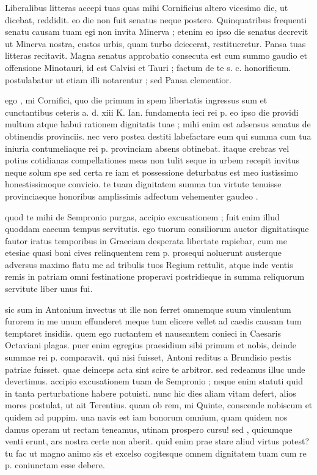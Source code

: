 


 Liberalibus litteras accepi tuas quas mihi Cornificius altero vicesimo die, ut dicebat, reddidit. eo die non fuit senatus neque postero. Quinquatribus frequenti senatu causam tuam egi non invita Minerva ; etenim eo ipso die senatus decrevit ut Minerva nostra, custos urbis, quam turbo deiecerat, restitueretur. Pansa tuas litteras recitavit. Magna senatus approbatio consecuta est cum summo gaudio et offensione Minotauri, id est Calvisi et Tauri ; factum de te s. c. honorificum. postulabatur ut etiam illi notarentur ; sed Pansa clementior.

 ego , mi Cornifici, quo die primum in spem libertatis ingressus sum et cunctantibus ceteris a. d. xiii K. Ian. fundamenta ieci rei p. eo ipso die providi multum atque habui rationem dignitatis tuae ; mihi enim est adsensus senatus de obtinendis provinciis. nec vero postea destiti labefactare eum qui summa cum tua iniuria contumeliaque rei p. provinciam absens obtinebat. itaque crebras vel potius cotidianas compellationes meas non tulit seque in urbem recepit invitus neque solum spe sed certa re iam et possessione deturbatus est meo iustissimo honestissimoque convicio. te tuam dignitatem summa tua virtute tenuisse provinciaeque honoribus amplissimis adfectum vehementer gaudeo .

 quod te mihi de Sempronio purgas, accipio excusationem ; fuit enim illud quoddam caecum tempus servitutis. ego tuorum consiliorum auctor dignitatisque fautor iratus temporibus in Graeciam desperata libertate rapiebar, cum me etesiae quasi boni cives relinquentem rem p. prosequi noluerunt austerque adversus maximo flatu me ad tribulis tuos Regium rettulit, atque inde ventis remis in patriam omni festinatione properavi postridieque in summa reliquorum servitute liber unus fui.

 sic sum in Antonium invectus ut ille non ferret omnemque suum vinulentum furorem in me unum effunderet meque tum elicere vellet ad caedis causam tum temptaret insidiis. quem ego ructantem et nauseantem conieci in Caesaris Octaviani plagas. puer enim egregius praesidium sibi primum et nobis, deinde summae rei p. comparavit. qui nisi fuisset, Antoni reditus a Brundisio pestis patriae fuisset. quae deinceps acta sint scire te arbitror. sed redeamus illuc unde devertimus. accipio excusationem tuam de Sempronio ; neque enim statuti quid in tanta perturbatione habere potuisti. nunc hic dies aliam vitam defert, alios mores postulat, ut ait Terentius. quam ob rem, mi Quinte, conscende nobiscum et quidem ad puppim. una navis est iam bonorum omnium, quam quidem nos damus operam ut rectam teneamus, utinam prospero cursu! sed , quicumque venti erunt, ars nostra certe non aberit. quid enim prae stare aliud virtus potest? tu fac ut magno animo sis et excelso cogitesque omnem dignitatem tuam cum re p. coniunctam esse debere.
